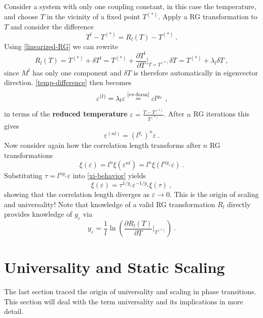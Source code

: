 	Consider a system with only one coupling constant, in this case the temperature, and choose $T$ in the vicinity of a fixed point $T^{(*)}$. Apply a RG transformation to $T$ and consider the difference
	\begin{equation} \label{temp-difference}
		T^l - T^{(*)} =	R_l(T) - T^{(*)}~.
	\end{equation}
	Using \autoref{linearized-RG} we can rewrite
	\begin{equation}
		R_l(T) =	T^{(*)} + \delta T^l =	T^{(*)} + \frac{\partial T^l}{\partial T} \bigg |_{T =	T^{(*)}} \delta T =	T^{(*)} + \lambda_l \delta T~,
	\end{equation}
	since $M^l$ has only one component and $\delta T$ is therefore automatically in eigenvector direction. \autoref{temp-difference} then becomes
	\def\equationautorefname{Eq.}
	\begin{equation} \label{coupling-constant-ev-scaling}
		\varepsilon^{(l)} =	\lambda_l \varepsilon \overset{\text{\autoref{ev-form}}}{=} \varepsilon l^{y_\varepsilon}~,
	\end{equation}\def\equationautorefname{equation}
	in terms of the \textbf{reduced temperature} $ \varepsilon =	\frac{T - T^{(*)}}{T^{(*)}}$. After $n$ RG iterations this gives
	\begin{equation}
		\varepsilon^{(nl)} = \left( l^{y_\varepsilon}	\right)^n \varepsilon~.
	\end{equation}
	Now consider again how the correlation length transforms after $n$ RG transformations
	\begin{equation} \label{xi-behavior}
		\xi(\varepsilon) =	l^n \xi(\varepsilon^{nl}) =	l^n \xi( l^{ny_\varepsilon} \varepsilon)~.
	\end{equation}
	Substituting $\tau =	l^{ny_\varepsilon} \varepsilon$ into \autoref{xi-behavior} yields
	\begin{equation} \label{Eq::RG-xi-scaling}
		\xi(\varepsilon) =	\tau^{1 / y_\varepsilon} \varepsilon^{-1/ y_\varepsilon} \xi(\tau)~,
	\end{equation}
	showing that the correlation length diverges as $\varepsilon \rightarrow 0$. This is the origin of scaling and universality! Note that knowledge of a valid RG transformation $R_l$ directly provides knowledge of $y_\varepsilon$ via
	\begin{equation}
		y_\varepsilon =	\frac{1}{l} \ln \left(\frac{\partial R_l (T)}{\partial T} \bigg|_{T^{(*)}}\right)~.
	\end{equation}
	\section{Universality and Static Scaling} \label{Section::Universality}
	The last section traced the origin of universality and scaling in phase transitions. This section will deal with the term universality and its implications in more detail. \\
	
